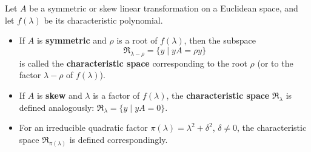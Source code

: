 Let $A$ be a symmetric or skew linear transformation on a Euclidean space, and let $f(\lambda)$ be its characteristic polynomial.

\begin{itemize}
\item If $A$ is \textbf{symmetric} and $\rho$ is a root of $f(\lambda)$, then the subspace
$$\mathfrak{R}_{\lambda-\rho} = \{ y \mid yA = \rho y \}$$
is called the \textbf{characteristic space} corresponding to the root $\rho$ (or to the factor $\lambda - \rho$ of $f(\lambda)$).

\item If $A$ is \textbf{skew} and $\lambda$ is a factor of $f(\lambda)$, the \textbf{characteristic space} $\mathfrak{R}_{\lambda}$ is defined analogously: $\mathfrak{R}_{\lambda} = \{ y \mid yA = 0 \}$.

\item For an irreducible quadratic factor $\pi(\lambda) = \lambda^2 + \delta^2$, $\delta \neq 0$, the characteristic space $\mathfrak{R}_{\pi(\lambda)}$ is defined correspondingly.
\end{itemize}
